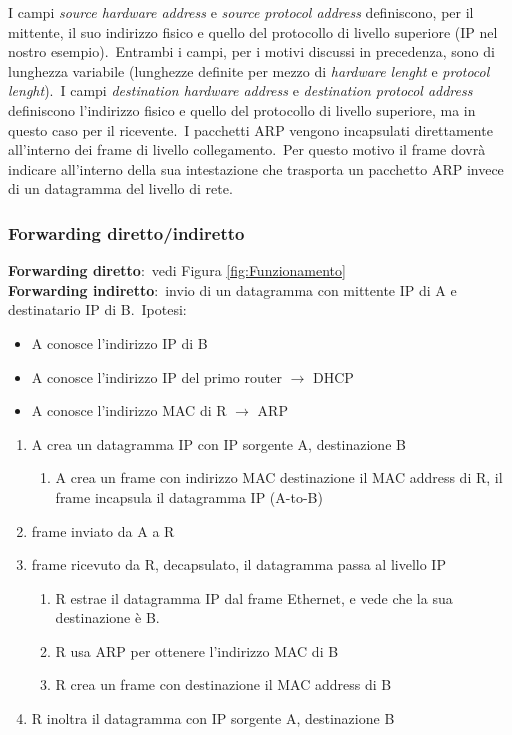 I campi \emph{source hardware address} e \emph{source protocol address} definiscono, per il mittente, il suo indirizzo fisico e quello del protocollo di livello superiore (IP nel nostro esempio).\
Entrambi i campi, per i motivi discussi in precedenza, sono di lunghezza variabile (lunghezze definite per mezzo di \emph{hardware lenght} e \emph{protocol lenght}).\
I campi \emph{destination hardware address} e \emph{destination protocol address} definiscono l'indirizzo fisico e quello del protocollo di livello superiore, ma in questo caso per il ricevente.\
I pacchetti ARP vengono incapsulati direttamente all'interno dei frame di livello collegamento.\
Per questo motivo il frame dovrà indicare all'interno della sua intestazione che trasporta un pacchetto ARP invece di un datagramma del livello di rete.

\subsubsection{Forwarding diretto/indiretto}

\textbf{Forwarding diretto}:\ vedi Figura \ref{fig:Funzionamento}\\
\textbf{Forwarding indiretto}:\ invio di un datagramma con mittente IP di A e destinatario IP di B.\
Ipotesi:
\begin{itemize}
    \item A conosce l’indirizzo IP di B
    \item A conosce l’indirizzo IP del primo router $\rightarrow$ DHCP
    \item A conosce l’indirizzo MAC di R $\rightarrow$ ARP
\end{itemize}
\begin{enumerate}
    \item A crea un datagramma IP con IP sorgente A, destinazione B
          \begin{enumerate}
              \item A crea un frame con indirizzo MAC destinazione il MAC address di R, il frame incapsula il datagramma IP (A-to-B)
          \end{enumerate}
    \item frame inviato da A a R
    \item frame ricevuto da R, decapsulato, il datagramma passa al livello IP
          \begin{enumerate}
              \item R estrae il datagramma IP dal frame Ethernet, e vede che la sua destinazione è B.
              \item R usa ARP per ottenere l’indirizzo MAC di B
              \item R crea un frame con destinazione il MAC address di B
          \end{enumerate}
    \item R inoltra il datagramma con IP sorgente A, destinazione B
\end{enumerate}

